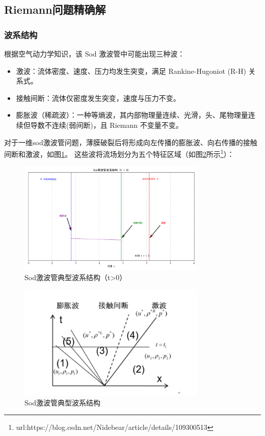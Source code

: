 \documentclass[UTF8]{ctexart}
\begin{document}
\subsection{Riemann问题精确解}
\subsubsection{波系结构}
根据空气动力学知识\cite{anderson2019}，该 Sod 激波管中可能出现三种波：
\begin{itemize}
    \item 激波：流体密度、速度、压力均发生突变，满足 Rankine-Hugoniot (R-H) 关系式。
    \item 接触间断：流体仅密度发生突变，速度与压力不变。
    \item 膨胀波（稀疏波）：一种等熵波，其内部物理量连续、光滑，头、尾物理量连续但导数不连续(弱间断)，且 Riemann 不变量不变。
\end{itemize}
对于一维sod激波管问题，薄膜破裂后将形成向左传播的膨胀波、向右传播的接触间断和激波，如图\ref{fig:wave_structure_1}。
这些波将流场划分为五个特征区域（如图\ref{fig:wave_structure_2}所示\footnote{url:https://blog.csdn.net/Nidebear/article/details/109300513}）：
\begin{figure}[H]
    \centering
    \includegraphics[width=0.8\textwidth]{wave_structure_1.png}
    \caption{Sod激波管典型波系结构（t>0）}
    \label{fig:wave_structure_1}
\end{figure}
\begin{figure}[H]
    \centering
    \includegraphics[width=0.8\textwidth]{wave_structure_2.png}
    \caption{Sod激波管典型波系结构}
    \label{fig:wave_structure_2}
\end{figure}
\end{document}
